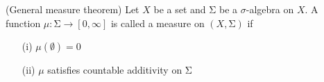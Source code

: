 \vspace{2ex}
\begin{defi}
(General measure theorem) Let $X$ be a set and $\mathrm{\Sigma} $ be a $\sigma  $-algebra on $X$. A function $\mu :\mathrm{\Sigma}  \rightarrow [0,\infty ]$ is called a measure on $(X,\mathrm{\Sigma} )$ if
\begin{itemize}
\item[(i)] $\mu (\emptyset)=0$
\item[(ii)] $\mu $ satisfies countable additivity on $\mathrm{\Sigma} $
\end{itemize} 
\end{defi}
\vspace{2ex}

